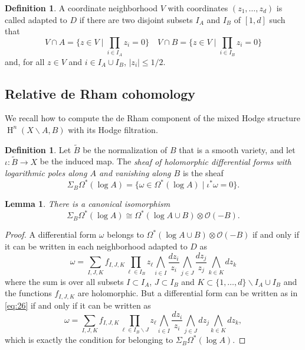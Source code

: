 \documentclass[11pt,a4paper]{amsart}
\newcommand{\caO}{\mathcal{O}}
\DeclareMathOperator{\rH}{H}
\numberwithin{equation}{section}
\theoremstyle{plain}
\newtheorem{lem}[prop]{Lemma}
\theoremstyle{definition}
\newtheorem{df}[prop]{Definition}
\begin{document}
\begin{df}\label{def:11}
  A coordinate neighborhood $V$ with coordinates $(z_1,\dots , z_d)$ is called adapted to
$D$ if there are two disjoint subsets $I_A$ and $I_B$ of $[1,d]$ such that
\begin{displaymath}
  V\cap A=\{z\in V\mid \prod_{i\in I_A} z_i =0\}\quad
  V\cap B=\{z\in V\mid \prod_{i\in I_B} z_i =0\}
\end{displaymath}
and, for all $z\in V$ and  $i\in I_A\cup I_B$,  $|z_i|\le 1/2$.
\end{df}


\subsection{Relative de Rham cohomology}
\label{sec:relative-de-rham}
We recall how to compute the de Rham component of the mixed
Hodge structure  
$\rH^{n}(X\smallsetminus A,B)$ with its Hodge filtration.

\begin{df}\label{def:7} Let $\widetilde B$ be the normalization of $B$
  that is a smooth variety, and let $\iota \colon \widetilde B\to X$
  be the induced map. The \emph{sheaf of holomorphic differential
    forms with logarithmic poles along $A$ and vanishing along $B$} is
  the sheaf
  \begin{displaymath}
    \Sigma _{B}\Omega ^{\ast}(\log A)=
    \{\omega \in \Omega ^{\ast}(\log A)\mid \iota ^{\ast}\omega =0\}.
  \end{displaymath}
\end{df}

\begin{lem}\label{lemm:2} There is a canonical isomorphism
  \begin{displaymath}
    \Sigma _{B}\Omega ^{\ast}(\log A) \cong
    \Omega ^{\ast}(\log A\cup B)\otimes \caO(-B)
    .
  \end{displaymath}
\end{lem}
\begin{proof}
  A differential form $\omega $ belongs to $\Omega ^{\ast}(\log A\cup
  B)\otimes \caO(-B)$ if and only if it can be written in each
  neighborhood adapted to $D$ as
  \begin{equation}\label{eq:26}
    \omega =\sum _{I,J,K} f_{I,J,K}\prod _{\ell\in I_B}z_\ell
    \bigwedge_{i\in I}\frac{dz_i}{z_i}
    \bigwedge _{j\in J}\frac{dz_j}{z_j}
    \bigwedge_{k\in K}dz_k
  \end{equation}
where the sum is over all subsets $I\subset I_A$, $J\subset I_{B}$ and
$K\subset \{1,\dots,d\}\smallsetminus I_A\cup I_B$ and the functions
$f_{I,J,K}$ are holomorphic. But a differential
form can be written as in \eqref{eq:26} if and only if it can be
written as
  \begin{equation}\label{eq:46}
    \omega =\sum _{I,J,K} f_{I,J,K}\prod _{\ell\in I_B\smallsetminus J}z_\ell
    \bigwedge_{i\in I}\frac{dz_i}{z_i}
    \bigwedge _{j\in J}dz_j
    \bigwedge_{k\in K}dz_k,
  \end{equation}
which is exactly the condition for belonging to $\Sigma _{B}\Omega
^{\ast}(\log A)$. 
\end{proof}
\end{document}
